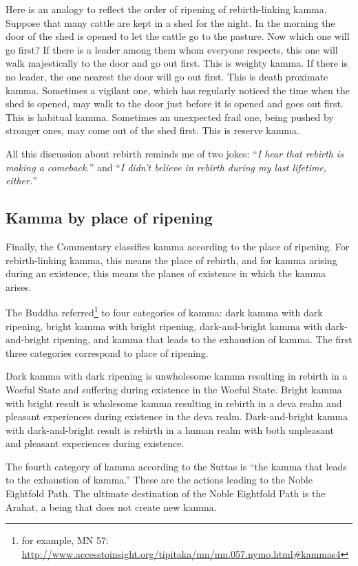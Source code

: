 Here is an analogy to reflect the order of ripening of rebirth-linking kamma. Suppose that many cattle are kept in a shed for the night. In the morning the door of the shed is opened to let the cattle go to the pasture. Now which one will go first? If there is a leader among them whom everyone respects, this one will walk majestically to the door and go out first. This is weighty kamma. If there is no leader, the one nearest the door will go out first. This is death proximate kamma. Sometimes a vigilant one, which has regularly noticed the time when the shed is opened, may walk to the door just before it is opened and goes out first. This is habitual kamma. Sometimes an unexpected frail one, being pushed by stronger ones, may come out of the shed first. This is reserve kamma.

All this discussion about rebirth reminds me of two jokes: “\textit{I hear that rebirth is making a comeback.}” and “\textit{I didn’t believe in rebirth during my last lifetime, either.}”

\subsection*{Kamma by place of ripening}

Finally, the Commentary classifies kamma according to the place of ripening. For rebirth-linking kamma, this means the place of rebirth, and for kamma arising during an existence, this means the planes of existence in which the kamma arises.

The Buddha referred\footnote{for example, MN 57: \url{http://www.accesstoinsight.org/tipitaka/mn/mn.057.nymo.html\#kammas4}} to four categories of kamma: dark kamma with dark ripening, bright kamma with bright ripening, dark-and-bright kamma with dark-and-bright ripening, and kamma that leads to the exhaustion of kamma. The first three categories correspond to place of ripening.

Dark kamma with dark ripening is unwholesome kamma resulting in rebirth in a Woeful State and suffering during existence in the Woeful State. Bright kamma with bright result is wholesome kamma resulting in rebirth in a deva realm and pleasant experiences during existence in the deva realm. Dark-and-bright kamma with dark-and-bright result is rebirth in a human realm with both unpleasant and pleasant experiences during existence. 

The fourth category of kamma according to the Suttas is “the kamma that leads to the exhaustion of kamma.” These are the actions leading to the Noble Eightfold Path. The ultimate destination of the Noble Eightfold Path is the Arahat, a being that does not create new kamma.

